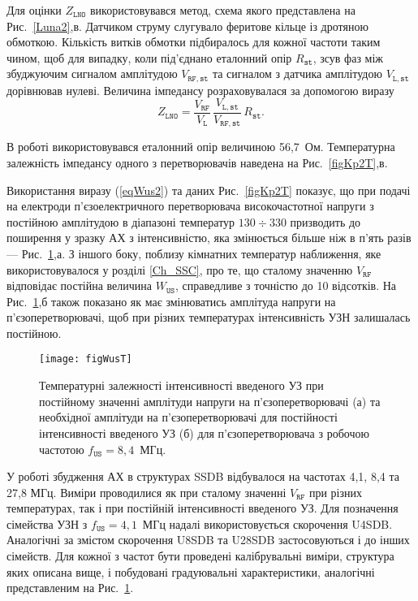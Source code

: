 \documentclass[a4paper,14pt,oneside,openany]{memoir}
\begin{document}
Для оцінки $Z_\mathtt{LNO}$ використовувався метод,
схема якого представлена на Рис.~\ref{Luna2},в.
Датчиком струму слугувало феритове кільце із дротяною обмоткою.
Кількість витків обмотки підбиралось для кожної частоти таким чином, щоб для випадку, коли під'єднано еталонний опір $R_\mathtt{st}$,
зсув фаз між збуджуючим сигналом амплітудою $V_\mathtt{RF,st}$ та сигналом з датчика амплітудою $V_\mathtt{L,st}$
дорівнював нулеві.
Величина імпедансу розраховувалася за допомогою виразу
 \begin{equation}
 \label{eqZlno}
 Z_\mathtt{LNO}=\frac{V_\mathtt{RF}}{V_\mathtt{L}}\,\frac{V_\mathtt{L,st}}{V_\mathtt{RF,st}}\,R_\mathtt{st}.
 \end{equation}

В роботі використовувався еталонний опір величиною 56,7~Ом.
Температурна залежність імпедансу одного з перетворювачів наведена на Рис.~\ref{figKp2T},в.

Використання виразу (\ref{eqWus2}) та даних Рис.~\ref{figKp2T} показує, що при подачі на електроди п'єзоелектричного перетворювача
високочастотної напруги з постійною амплітудою в діапазоні температур $130\div330$ призводить до поширення у зразку АХ з
інтенсивністю, яка змінюється більше ніж в п'ять разів --- Рис.~\ref{figWusT},а.
З іншого боку, поблизу кімнатних температур наближення, яке використовувалося у розділі \ref{Ch_SSC}, про те, що сталому значенню
$V_\mathtt{RF}$ відповідає постійна величина $ W_\mathtt{US}$, справедливе з точністю до 10 відсотків.
На Рис.~\ref{figWusT},б також показано як має змінюватись амплітуда напруги на п'єзоперетворювачі, щоб при різних температурах
інтенсивність УЗН залишалась постійною.


\begin{figure}
\center
\texttt{[image: figWusT]}%
\caption{\label{figWusT}
Температурні залежності
інтенсивності введеного УЗ при постійному значенні амплітуди напруги на п'єзоперетворювачі (а)
та необхідної амплітуди на п'єзоперетворювачі для постійності інтенсивності введеного УЗ (б)
для п'єзоперетворювача з робочою частотою $f_\mathtt{US}=8,4$~МГц.
}
\end{figure}

У роботі збудження АХ в структурах SSDB відбувалося на частотах 4,1, 8,4 та 27,8 МГц.
Виміри проводилися як при сталому значенні $V_\mathtt{RF}$ при різних температурах, так і при постійній інтенсивності введеного УЗ.
Для позначення сімейства УЗН з $f_\mathtt{US}=4,1$~МГц надалі використовується скорочення U4SDB.
Аналогічні за змістом скорочення U8SDB та U28SDB застосовуються і до інших сімейств.
Для кожної з частот бути проведені калібрувальні виміри, структура яких описана вище, і побудовані градуювальні характеристики,
аналогічні представленим на Рис.~\ref{figWusT}.
\end{document}
